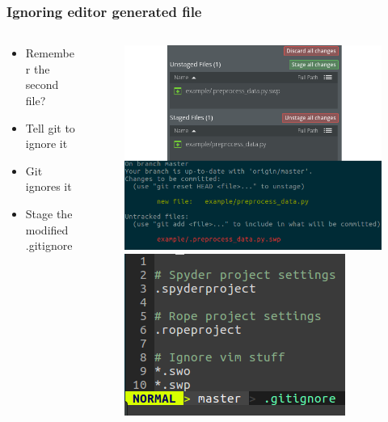 \begin{frame}
	\frametitle{Ignoring editor generated file}
	\begin{columns}
		\begin{column}{0.4\textwidth}
			\begin{itemize}[<+->]
				\item Remember the second file?
				\item Tell git to ignore it
				\item Git ignores it
				\item Stage the modified .gitignore
			\end{itemize}
		\end{column}
	\begin{column}{0.6\textwidth}
		\begin{figure}
			\centering
			\begin{overprint}
				\includegraphics[width=\textwidth]{./pictures/to_ignore.png}
				\onslide<2>\includegraphics[width=\textwidth]{./pictures/gitignore.png}

\end{overprint}
\end{figure}
\end{column}
\end{columns}
\end{frame}

